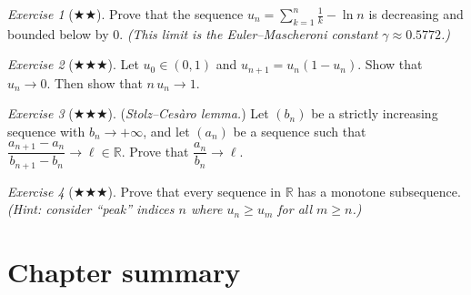\documentclass[12pt,a4paper,openany]{book}
\newcommand{\R}{\mathbb{R}}
\theoremstyle{definition}
\theoremstyle{remark}
\newtheorem{exercise}{Exercise}[chapter]
\begin{document}
\begin{exercise}[$\bigstar\bigstar$]\label{exo:seq10}
Prove that the sequence $u_n = \displaystyle\sum_{k=1}^{n}\frac{1}{k} - \ln n$
is decreasing and bounded below by $0$. \textit{(This limit is the Euler--Mascheroni
constant $\gamma \approx 0.5772$.)}
\end{exercise}

\begin{exercise}[$\bigstar\bigstar\bigstar$]\label{exo:seq11}
Let $u_0 \in (0,1)$ and $u_{n+1} = u_n(1 - u_n)$. Show that $u_n \to 0$.
Then show that $n\,u_n \to 1$.
\end{exercise}

\begin{exercise}[$\bigstar\bigstar\bigstar$]\label{exo:seq12}
(\textit{Stolz--Ces\`aro lemma.})
Let $(b_n)$ be a strictly increasing sequence with $b_n \to +\infty$, and
let $(a_n)$ be a sequence such that
$\dfrac{a_{n+1} - a_n}{b_{n+1} - b_n} \to \ell \in \R$.
Prove that $\dfrac{a_n}{b_n} \to \ell$.
\end{exercise}

\begin{exercise}[$\bigstar\bigstar\bigstar$]\label{exo:seq13}
Prove that every sequence in $\R$ has a monotone subsequence.
\textit{(Hint: consider ``peak'' indices $n$ where $u_n \geq u_m$ for all $m \geq n$.)}
\end{exercise}

\section*{Chapter summary}
\end{document}
